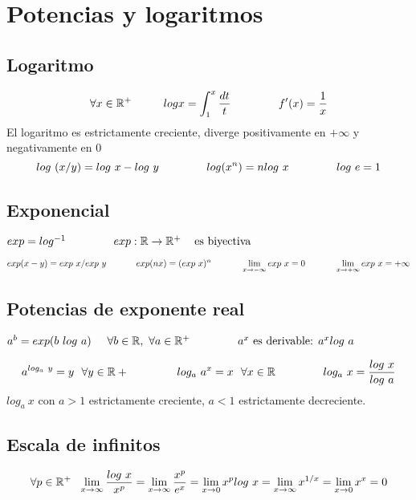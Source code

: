 \section{Potencias y logaritmos}
\subsection{Logaritmo}
$$ \forall x\in\mathbb{R}^+ \hspace{1cm}log x = \int_1^x \frac{dt}{t} \hspace{1.5cm}f'(x)=\frac{1}{x} $$
El logaritmo es estrictamente creciente, diverge positivamente en $+\infty$ y negativamente en $0$
$$ log \ (x/y) = log\ x-log\ y\hspace{1.5cm} log(x^n)=nlog\ x \hspace{1.5cm} log\ e=1$$

\subsection{Exponencial}
\begin{center}
$ exp = log^{-1} \hspace{1.5cm} exp:\mathbb{R}\rightarrow\mathbb{R}^+ \hspace{0.3cm} \text{ es biyectiva} $
\end{center}
$$ exp(x-y) = exp\ x/exp\ y \hspace{1.2cm} exp(nx) = (exp\ x)^n \hspace{1.2cm} \lim_{x\rightarrow -\infty} exp\ x = 0\hspace{1.2cm} \lim_{x\rightarrow +\infty} exp\ x= +\infty$$

\subsection{Potencias de exponente real}
\begin{center}
$ a^b = exp(b\ log\ a) \hspace{0.5cm} \forall b\in\mathbb{R}, \ \forall a\in\mathbb{R}^+ \hspace{1.5cm} a^x\text{ es derivable: }a^xlog \ a$
\end{center}
$$ a^{log_a\ y} = y \ \ \forall y\in\mathbb{R}+\hspace{1.5cm} log_a\ a^x = x\ \ \forall x\in\mathbb{R} \hspace{1.5cm} log_a\ x = \frac{log\ x}{log\ a}$$
$log_a \ x$ con $a>1$ estrictamente creciente, $a<1$ estrictamente decreciente.
\subsection{Escala de infinitos}
$$ \forall p\in\R^+ \ \ \limx \frac{log\ x}{x^p} = \limx \frac{x^p}{e^x} = \lim_{x\rightarrow 0} x^p log\ x = 
\limx x^{1/x} = \lim_{x\rightarrow0} x^x = 0 $$

